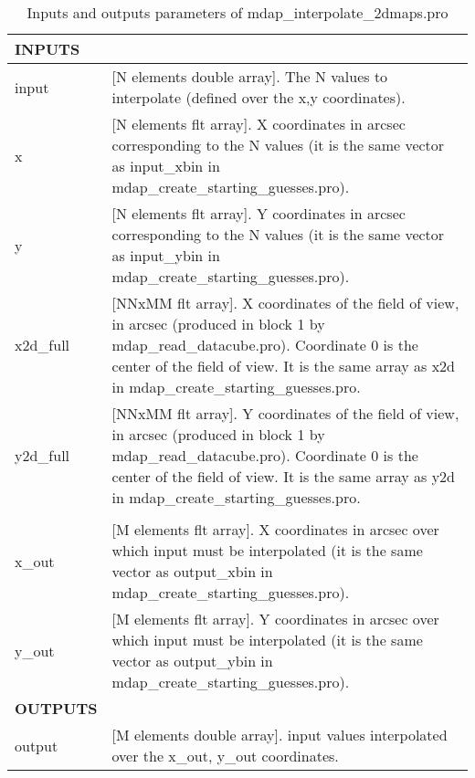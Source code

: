 \documentclass[11pt]{book}
\begin{document}
\begin{center}
\begin{longtable}{p{2.7cm}| p{11.1cm}}
\caption{Inputs and outputs parameters of mdap\_interpolate\_2dmaps.pro} \label{dap_tab:mdap_interpolate_2dmaps} \\
\hline
\endfirsthead
\hline
\endhead
\hline
\endlastfoot
\hline
{\bf  INPUTS} & \\
\hline
input  & [N elements double array]. The N values to interpolate (defined over the x,y coordinates).  \\
%
x  & [N  elements flt array]. X coordinates in arcsec corresponding to the N values (it is the same vector as input\_xbin in  mdap\_create\_starting\_guesses.pro).  \\
%
y  & [N  elements flt array]. Y coordinates in arcsec corresponding to the N values (it is the same vector as input\_ybin in  mdap\_create\_starting\_guesses.pro).   \\
%
x2d\_full & [NNxMM flt array].  X coordinates of the field of view, in arcsec (produced in block 1 by mdap\_read\_datacube.pro). 
                  Coordinate 0 is the center of the field of view. It is the same array as x2d in mdap\_create\_starting\_guesses.pro.\\
%
%
y2d\_full & [NNxMM flt array].  Y coordinates of the field of view, in arcsec (produced in block 1 by mdap\_read\_datacube.pro). 
                   Coordinate 0 is the center of the field of view. It is the same array as y2d in mdap\_create\_starting\_guesses.pro.\\ \\
%
x\_out  & [M elements flt array]. X coordinates in arcsec over which input must be interpolated (it is the same vector as 
                                  output\_xbin in  mdap\_create\_starting\_guesses.pro). \\
%
y\_out  & [M elements flt array].  Y coordinates in arcsec over which input must be interpolated (it is the same vector as 
                                  output\_ybin in  mdap\_create\_starting\_guesses.pro).  \\
%
\hline
{\bf OUTPUTS} & \\
output  &  [M elements double array].  input values interpolated over the x\_out, y\_out  coordinates.  \\
\hline
\end{longtable}
\end{center}
\end{document}
